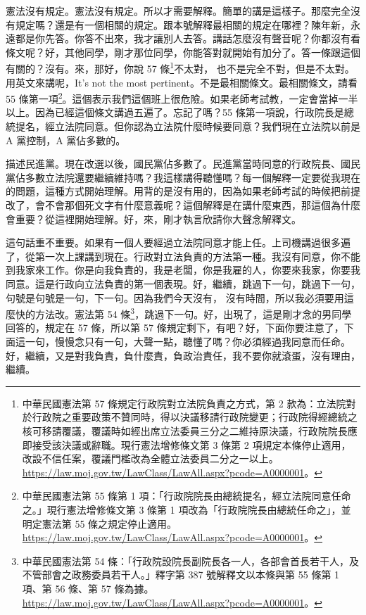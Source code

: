 \hypertarget{c08:cue:12}{}憲法沒有規定。憲法沒有規定。所以才需要解釋。簡單的講是這樣子。那麼完全沒有規定嗎？還是有一個相關的規定。跟本號解釋最相關的規定在哪裡？陳年新，永遠都是你先答。你答不出來，我才讓別人去答。講話怎麼沒有聲音呢？你都沒有看條文呢？好，其他同學，剛才那位同學，你能答對就開始有加分了。答一條跟這個有關的？沒有。來，那好，你說 57 條\footnote{中華民國憲法第 57 條規定行政院對立法院負責之方式，第 2 款為：立法院對於行政院之重要政策不贊同時，得以決議移請行政院變更；行政院得經總統之核可移請覆議，覆議時如經出席立法委員三分之二維持原決議，行政院院長應即接受該決議或辭職。現行憲法增修條文第 3 條第 2 項規定本條停止適用，改設不信任案，覆議門檻改為全體立法委員二分之一以上。\url{https://law.moj.gov.tw/LawClass/LawAll.aspx?pcode=A0000001}。}不太對，
\hypertarget{c08:cue:13}{}也不是完全不對，但是不太對。用英文來講呢，It's not the most pertinent。不是最相關條文。最相關條文，請看 55 條第一項\footnote{中華民國憲法第 55 條第 1 項：「行政院院長由總統提名，經立法院同意任命之。」現行憲法增修條文第 3 條第 1 項改為「行政院院長由總統任命之」，並明定憲法第 55 條之規定停止適用。\url{https://law.moj.gov.tw/LawClass/LawAll.aspx?pcode=A0000001}。}。這個表示我們這個班上很危險。如果老師考試教，一定會當掉一半以上。因為已經這個條文講過五遍了。忘記了嗎？55 條第一項說，行政院長是總統提名，經立法院同意。但你認為立法院什麼時候要同意？我們現在立法院以前是 A 黨控制，A 黨佔多數的。

\hypertarget{c08:cue:14}{}描述民進黨。現在改選以後，國民黨佔多數了。民進黨當時同意的行政院長、國民黨佔多數立法院還要繼續維持嗎？我這樣講得聽懂嗎？每一個解釋一定要從我現在的問題，這種方式開始理解。用背的是沒有用的，因為如果老師考試的時候把前提改了，會不會那個死文字有什麼意義呢？這個解釋是在講什麼東西，那這個為什麼會重要？從這裡開始理解。好，來，剛才執言欣請你大聲念解釋文。

\hypertarget{c08:cue:15}{}這句話重不重要。如果有一個人要經過立法院同意才能上任。上司機講過很多遍了，從第一次上課講到現在。行政對立法負責的方法第一種。我沒有同意，你不能到我家來工作。你是向我負責的，我是老闆，你是我雇的人，你要來我家，你要我同意。這是行政向立法負責的第一個表現。好，繼續，跳過下一句，跳過下一句，句號是句號是一句，下一句。因為我們今天沒有，
\hypertarget{c08:cue:16}{}沒有時間，所以我必須要用這麼快的方法改。憲法第 54 條\footnote{中華民國憲法第 54 條：「行政院設院長副院長各一人，各部會首長若干人，及不管部會之政務委員若干人。」釋字第 387 號解釋文以本條與第 55 條第 1 項、第 56 條、第 57 條為據。\url{https://law.moj.gov.tw/LawClass/LawAll.aspx?pcode=A0000001}。}，跳過下一句。好，出現了，這是剛才念的男同學回答的，規定在 57 條，所以第 57 條規定剩下，有吧？好，下面你要注意了，下面這一句，慢慢念只有一句，大聲一點，聽懂了嗎？你必須經過我同意而任命。好，繼續，又是對我負責，負什麼責，負政治責任，我不要你就滾蛋，沒有理由，繼續。

